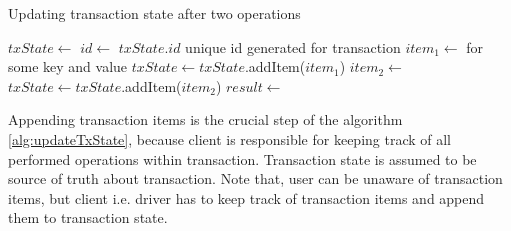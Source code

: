 

\begin{algorithm}
  \caption{Updating transaction state after two operations}
  \label{alg:updateTxState}
  \begin{algorithmic}  	    
    \State $txState \gets$ 
    \State $id \gets$ $txState.id$ unique id generated for transaction
    \State $item_{1} \gets $  \Comment for some key and value
    \State $txState \gets txState$.addItem($item_{1}$)
    \State $item_{2} \gets $ 
    \State $txState \gets txState$.addItem($item_{2}$)
    \State $result \gets $     
  \end{algorithmic}
\end{algorithm}

Appending transaction items is the crucial step of the algorithm \ref{alg:updateTxState}, because client is responsible for keeping track of all performed operations within transaction. Transaction state is assumed to be source of truth about transaction.
Note that, user can be unaware of transaction items, but client i.e. driver has to keep track of transaction items and append them to transaction state.


